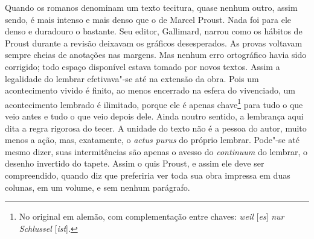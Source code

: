 Quando os romanos denominam um texto tecitura, quase nenhum outro, assim
sendo, é mais intenso e mais denso que o de Marcel Proust. Nada foi
para ele denso e duradouro o bastante. Seu editor, Gallimard, narrou como
os hábitos de Proust durante a revisão deixavam os gráficos
desesperados. As provas voltavam sempre cheias de anotações nas margens.
Mas nenhum erro ortográfico havia sido corrigido; todo espaço disponível
estava tomado por novos textos. Assim a legalidade do lembrar
efetivava"-se até na extensão da obra. Pois um acontecimento vivido é
finito, ao menos encerrado na esfera do vivenciado, um acontecimento
lembrado é ilimitado, porque ele é apenas chave\footnote{No
  original em alemão, com complementação entre chaves: \emph{weil} {[}\emph{es}{]} \emph{nur Schlussel} {[}\emph{ist}{]}. \versal{[N.~T.]}} para tudo o que veio antes e tudo o que veio
depois dele. Ainda noutro sentido, a lembrança aqui dita a regra
rigorosa do tecer. A unidade do texto não é a pessoa do autor, muito
menos a ação, mas, exatamente, o \emph{actus purus} do próprio lembrar.
Pode"-se até mesmo dizer, suas intermitências são apenas o avesso
do \emph{continuum} do lembrar, o desenho invertido do tapete. Assim o
quis Proust, e assim ele deve ser compreendido, quando diz que
preferiria ver toda sua obra impressa em duas colunas, em um volume, e
sem nenhum parágrafo.

